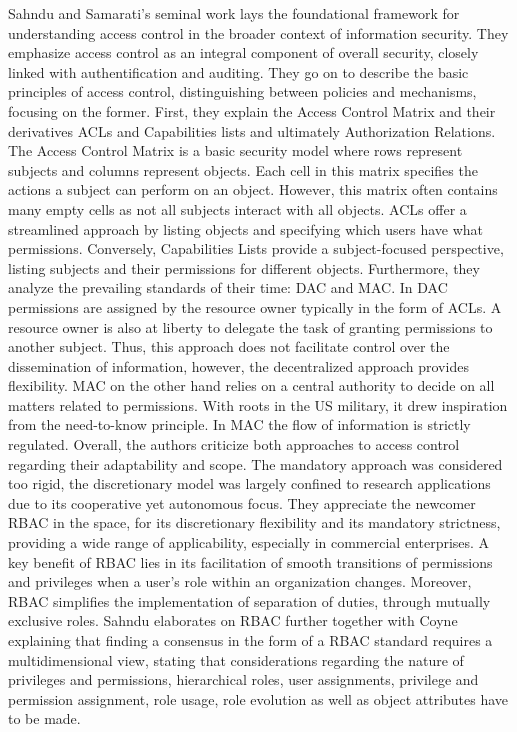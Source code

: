 Sahndu and Samarati's seminal work \cite{Sandhu1994} lays the foundational framework for understanding access control in the broader context of information security. They emphasize access control as an integral component of overall security, closely linked with authentification and auditing. They go on to describe the basic principles of access control, distinguishing between policies and mechanisms, focusing on the former. First, they explain the Access Control Matrix and their derivatives \acp{ACL} and Capabilities lists and ultimately Authorization Relations. The Access Control Matrix is a basic security model where rows represent subjects and columns represent objects. Each cell in this matrix specifies the actions a subject can perform on an object. However, this matrix often contains many empty cells as not all subjects interact with all objects. \acp{ACL} offer a streamlined approach by listing objects and specifying which users have what permissions. Conversely, Capabilities Lists provide a subject-focused perspective, listing subjects and their permissions for different objects. Furthermore, they analyze the prevailing standards of their time: \ac{DAC} and \ac{MAC}. In \ac{DAC} permissions are assigned by the resource owner typically in the form of \acp{ACL}. A resource owner is also at liberty to delegate the task of granting permissions to another subject. Thus, this approach does not facilitate control over the dissemination of information, however, the decentralized approach provides flexibility. \ac{MAC} on the other hand relies on a central authority to decide on all matters related to permissions. With roots in the US military, it drew inspiration from the need-to-know principle. In \ac{MAC} the flow of information is strictly regulated. Overall, the authors criticize both approaches to access control regarding their adaptability and scope. The mandatory approach was considered too rigid, the discretionary model was largely confined to research applications due to its cooperative yet autonomous focus. They appreciate the newcomer \ac{RBAC} in the space, for its discretionary flexibility and its mandatory strictness, providing a wide range of applicability, especially in commercial enterprises. A key benefit of \ac{RBAC} lies in its facilitation of smooth transitions of permissions and privileges when a user's role within an organization changes. Moreover, \ac{RBAC} simplifies the implementation of separation of duties, through mutually exclusive roles. Sahndu elaborates on \ac{RBAC} further together with Coyne \cite{Sandhu_Coyne_1994} explaining that finding a consensus in the form of a \ac{RBAC} standard requires a multidimensional view, stating that considerations regarding the nature of privileges and permissions, hierarchical roles, user assignments, privilege and permission assignment, role usage, role evolution as well as object attributes have to be made. \par
